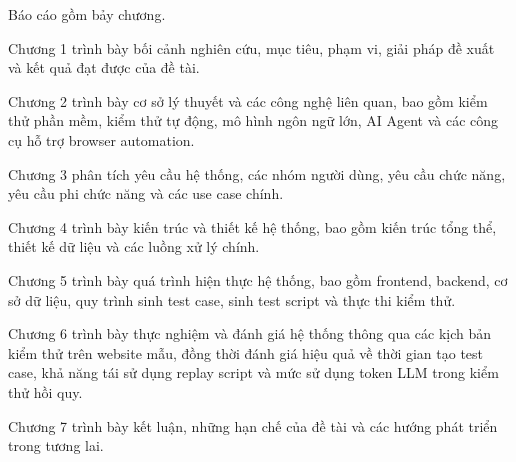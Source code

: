 Báo cáo gồm bảy chương.

Chương 1 trình bày bối cảnh nghiên cứu, mục tiêu, phạm vi, giải pháp đề xuất và kết quả đạt được của đề tài.

Chương 2 trình bày cơ sở lý thuyết và các công nghệ liên quan, bao gồm kiểm thử phần mềm, kiểm thử tự động, mô hình ngôn ngữ lớn, AI Agent và các công cụ hỗ trợ browser automation.

Chương 3 phân tích yêu cầu hệ thống, các nhóm người dùng, yêu cầu chức năng, yêu cầu phi chức năng và các use case chính.

Chương 4 trình bày kiến trúc và thiết kế hệ thống, bao gồm kiến trúc tổng thể, thiết kế dữ liệu và các luồng xử lý chính.

Chương 5 trình bày quá trình hiện thực hệ thống, bao gồm frontend, backend, cơ sở dữ liệu, quy trình sinh test case, sinh test script và thực thi kiểm thử.

Chương 6 trình bày thực nghiệm và đánh giá hệ thống thông qua các kịch bản kiểm thử trên website mẫu, đồng thời đánh giá hiệu quả về thời gian tạo test case, khả năng tái sử dụng replay script và mức sử dụng token LLM trong kiểm thử hồi quy.

Chương 7 trình bày kết luận, những hạn chế của đề tài và các hướng phát triển trong tương lai.

